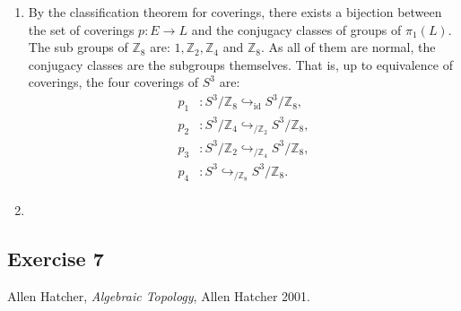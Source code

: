 \documentclass[11pt,a4paper]{article}
\newcommand{\id}{\operatorname{id}}
\newcommand{\Z}{\mathbb Z}
\begin{document}
\begin{enumerate}[label=\alph*)]
    \item By the classification theorem for coverings, there exists a bijection between the set of coverings $p\colon E \to L $ and the conjugacy classes of groups of $ \pi_1(L)$. The sub groups of $ \Z_8 $ are: $1, \Z_2, \Z_4 $ and $ \Z_8$. As all of them are normal, the conjugacy classes are the subgroups themselves. That is, up to equivalence of coverings, the four coverings of $ S^3 $ are:
    \begin{align*}
      p_1 &\colon S^3 / \Z_8 \hookrightarrow_{\id} S^3 / \Z_8, \\
      p_2 &\colon S^3 / \Z_4 \hookrightarrow_{/ \Z_2} S^3 / \Z_8, \\
      p_3 &\colon S^3 / \Z_2 \hookrightarrow_{/ \Z_4} S^3 / \Z_8, \\
      p_4 &\colon S^3 \hookrightarrow_{/ \Z_8} S^3 / \Z_8. \\
    \end{align*}

    \item
  \end{enumerate}

\subsection*{Exercise 7}

\begin{thebibliography}{9}

  Allen Hatcher,
  \textit{Algebraic Topology},
  Allen Hatcher 2001.

\end{thebibliography}
\end{document}
